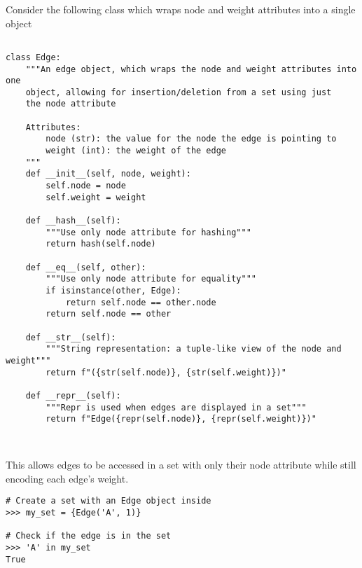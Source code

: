 \begin{problem} %
Consider the following  class which wraps node and weight attributes into a single object
\begin{lstlisting}

class Edge:
    """An edge object, which wraps the node and weight attributes into one
    object, allowing for insertion/deletion from a set using just
    the node attribute

    Attributes:
        node (str): the value for the node the edge is pointing to
        weight (int): the weight of the edge
    """
    def __init__(self, node, weight):
        self.node = node
        self.weight = weight

    def __hash__(self):
        """Use only node attribute for hashing"""
        return hash(self.node)

    def __eq__(self, other):
        """Use only node attribute for equality"""
        if isinstance(other, Edge):
            return self.node == other.node
        return self.node == other

    def __str__(self):
        """String representation: a tuple-like view of the node and weight"""
        return f"({str(self.node)}, {str(self.weight)})"

    def __repr__(self):
        """Repr is used when edges are displayed in a set"""
        return f"Edge({repr(self.node)}, {repr(self.weight)})"



\end{lstlisting}
This allows edges to be accessed in a set with only their node attribute while still encoding each edge's weight.

\begin{lstlisting}
# Create a set with an Edge object inside
>>> my_set = {Edge('A', 1)}

# Check if the edge is in the set
>>> 'A' in my_set
True


\end{lstlisting}
\end{problem}
